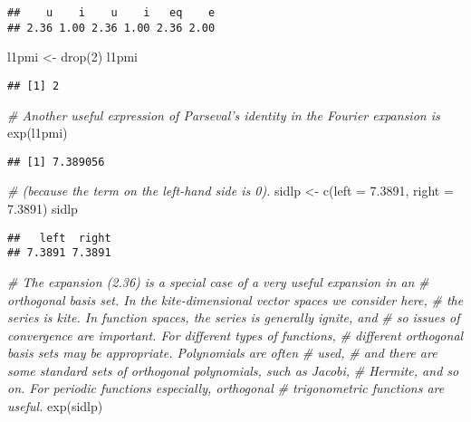\documentclass[
]{article}
\newenvironment{Shaded}{\begin{snugshade}}{\end{snugshade}}
\newcommand{\AttributeTok}[1]{\textcolor[rgb]{0.77,0.63,0.00}{#1}}
\newcommand{\CommentTok}[1]{\textcolor[rgb]{0.56,0.35,0.01}{\textit{#1}}}
\newcommand{\DecValTok}[1]{\textcolor[rgb]{0.00,0.00,0.81}{#1}}
\newcommand{\FloatTok}[1]{\textcolor[rgb]{0.00,0.00,0.81}{#1}}
\newcommand{\FunctionTok}[1]{\textcolor[rgb]{0.00,0.00,0.00}{#1}}
\newcommand{\NormalTok}[1]{#1}
\newcommand{\OtherTok}[1]{\textcolor[rgb]{0.56,0.35,0.01}{#1}}
\begin{document}
\begin{verbatim}
##    u    i    u    i   eq    e 
## 2.36 1.00 2.36 1.00 2.36 2.00
\end{verbatim}

\begin{Shaded}
\begin{Highlighting}[]
\NormalTok{l1pmi }\OtherTok{\textless{}{-}} \FunctionTok{drop}\NormalTok{(}\DecValTok{2}\NormalTok{)}
\NormalTok{l1pmi}
\end{Highlighting}
\end{Shaded}

\begin{verbatim}
## [1] 2
\end{verbatim}

\begin{Shaded}
\begin{Highlighting}[]
\CommentTok{\# Another useful expression of Parseval’s identity in the Fourier expansion is}
\FunctionTok{exp}\NormalTok{(l1pmi)}
\end{Highlighting}
\end{Shaded}

\begin{verbatim}
## [1] 7.389056
\end{verbatim}

\begin{Shaded}
\begin{Highlighting}[]
\CommentTok{\# (because the term on the left{-}hand side is 0).}
\NormalTok{sidlp }\OtherTok{\textless{}{-}} \FunctionTok{c}\NormalTok{(}\AttributeTok{left =} \FloatTok{7.3891}\NormalTok{, }\AttributeTok{right =} \FloatTok{7.3891}\NormalTok{)}
\NormalTok{sidlp}
\end{Highlighting}
\end{Shaded}

\begin{verbatim}
##   left  right 
## 7.3891 7.3891
\end{verbatim}

\begin{Shaded}
\begin{Highlighting}[]
\CommentTok{\# The expansion (2.36) is a special case of a very useful expansion in an}
\CommentTok{\# orthogonal basis set. In the kite{-}dimensional vector spaces we consider here,}
\CommentTok{\# the series is kite. In function spaces, the series is generally ignite, and }
\CommentTok{\# so issues of convergence are important. For different types of functions, }
\CommentTok{\# different orthogonal basis sets may be appropriate. Polynomials are often }
\CommentTok{\# used, }
\CommentTok{\# and there are some standard sets of orthogonal polynomials, such as Jacobi, }
\CommentTok{\# Hermite, and so on. For periodic functions especially, orthogonal }
\CommentTok{\# trigonometric functions are useful.}
\FunctionTok{exp}\NormalTok{(sidlp)}
\end{Highlighting}
\end{Shaded}
\end{document}

